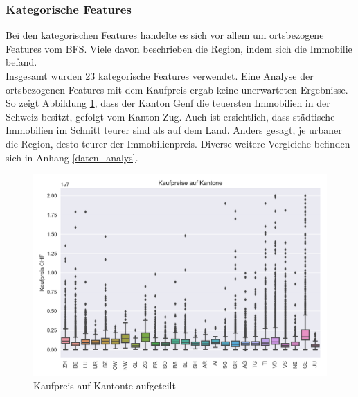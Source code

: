 \subsubsection{Kategorische Features}
Bei den kategorischen Features handelte es sich vor allem um ortsbezogene Features vom BFS. Viele davon beschrieben die Region, indem sich die Immobilie befand.\\
Insgesamt wurden 23 kategorische Features verwendet. Eine Analyse der ortsbezogenen Features mit dem Kaufpreis ergab keine unerwarteten Ergebnisse. So zeigt Abbildung \ref{fig:cantons}, dass der Kanton Genf die teuersten Immobilien in der Schweiz besitzt, gefolgt vom Kanton Zug. Auch ist ersichtlich, dass städtische Immobilien im Schnitt teurer sind als auf dem Land. Anders gesagt, je urbaner die Region, desto teurer der Immobilienpreis. Diverse weitere Vergleiche befinden sich in Anhang \ref{daten_analys}.\\[2ex]
\begin{figure}[ht]
\centering
\includegraphics[width=\textwidth]{images/boxPlot_cantons.png}
\caption[Kaufpreis auf Kantonte aufgeteilt]{Kaufpreis auf Kantonte aufgeteilt}%
\label{fig:cantons}
\end{figure}

